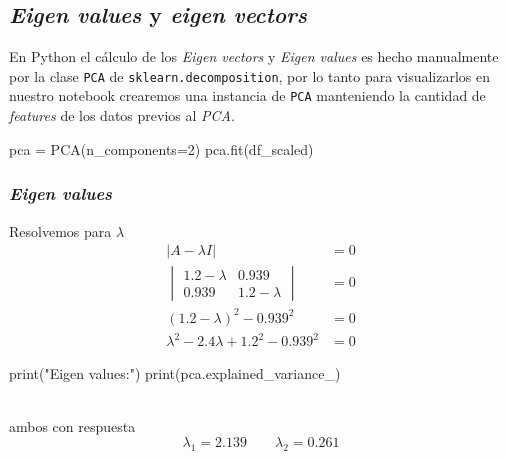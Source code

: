 \subsection{\textit{Eigen values} y \textit{eigen vectors}}\label{PCAmath-eigen}
En Python el cálculo de los \textit{Eigen vectors} y \textit{Eigen values} es hecho manualmente por la clase \texttt{PCA} de \texttt{sklearn.decomposition}, por lo tanto para visualizarlos en nuestro notebook crearemos una instancia de \texttt{PCA} manteniendo la cantidad de \textit{features} de los datos previos al \textit{PCA}.
\begin{jupyter}{5}
pca = PCA(n_components=2)
pca.fit(df_scaled)
\end{jupyter}
\subsubsection{\textit{Eigen values}}
\begin{minipage}[c]{0.48\textwidth}
Resolvemos para $\lambda$
\begin{align*}
|A-\lambda I| &= 0\\
\begin{vmatrix}
1.2-\lambda & 0.939\\
0.939 & 1.2-\lambda
\end{vmatrix} &= 0\\
(1.2-\lambda)^2-0.939^2 &= 0\\
\lambda^2-2.4\lambda+1.2^2-0.939^2 &= 0
\end{align*}
\end{minipage}
\hfill\vrule\hfill
\begin{minipage}[c]{0.48\textwidth}
\begin{jupyter}{6}
print("Eigen values:")
print(pca.explained_variance_)
\end{jupyter}
\end{minipage}\\
ambos con respuesta
\[ \lambda_1=2.139 \qquad \lambda_2=0.261 \]

